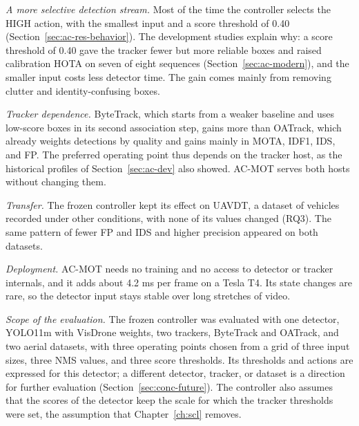 \emph{A more selective detection stream.} Most of the time the controller selects the HIGH action, with the smallest input and a score threshold of 0.40 (Section~\ref{sec:ac-res-behavior}). The development studies explain why: a score threshold of 0.40 gave the tracker fewer but more reliable boxes and raised calibration HOTA on seven of eight sequences (Section~\ref{sec:ac-modern}), and the smaller input costs less detector time. The gain comes mainly from removing clutter and identity-confusing boxes.

\emph{Tracker dependence.} ByteTrack, which starts from a weaker baseline and uses low-score boxes in its second association step, gains more than OATrack, which already weights detections by quality and gains mainly in MOTA, IDF1, IDS, and FP. The preferred operating point thus depends on the tracker host, as the historical profiles of Section~\ref{sec:ac-dev} also showed. AC-MOT serves both hosts without changing them.

\emph{Transfer.} The frozen controller kept its effect on UAVDT, a dataset of vehicles recorded under other conditions, with none of its values changed (RQ3). The same pattern of fewer FP and IDS and higher precision appeared on both datasets.

\emph{Deployment.} AC-MOT needs no training and no access to detector or tracker internals, and it adds about 4.2 ms per frame on a Tesla T4. Its state changes are rare, so the detector input stays stable over long stretches of video.

\emph{Scope of the evaluation.} The frozen controller was evaluated with one detector, YOLO11m with VisDrone weights, two trackers, ByteTrack and OATrack, and two aerial datasets, with three operating points chosen from a grid of three input sizes, three NMS values, and three score thresholds. Its thresholds and actions are expressed for this detector; a different detector, tracker, or dataset is a direction for further evaluation (Section~\ref{sec:conc-future}). The controller also assumes that the scores of the detector keep the scale for which the tracker thresholds were set, the assumption that Chapter~\ref{ch:scl} removes.

